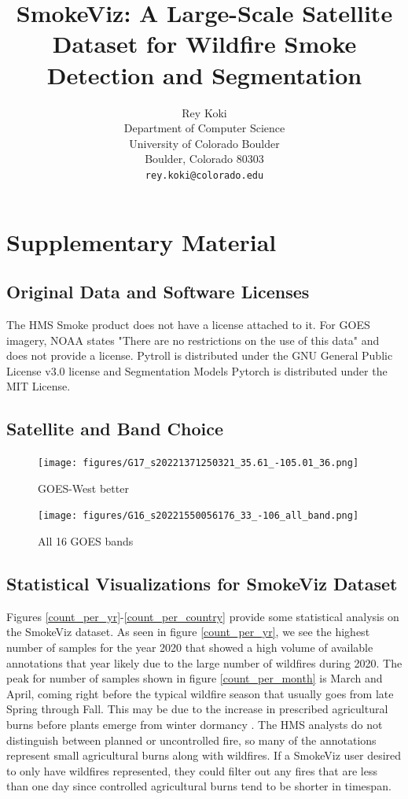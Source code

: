 \documentclass{article}
\title{SmokeViz: A Large-Scale Satellite Dataset for Wildfire Smoke Detection and Segmentation}
\author{%
  Rey Koki\\%
  Department of Computer Science\\
  University of Colorado Boulder\\
  Boulder, Colorado 80303\\
  \texttt{rey.koki@colorado.edu} \\
}
\begin{document}
\appendix

\section{Supplementary Material}

\subsection{Original Data and Software Licenses}

The HMS Smoke product does not have a license attached to it. For GOES imagery, NOAA states "There are no restrictions on the use of this data" and does not provide a license. Pytroll is distributed under the GNU General Public License v3.0 license and Segmentation Models Pytorch is distributed under the MIT License.


\subsection{Satellite and Band Choice}

\begin{figure}[!htb]
    \centering
    \texttt{[image: figures/G17\_s20221371250321\_35.61\_-105.01\_36.png]}
    \caption{GOES-West better}\label{G16_vs_G17}
\end{figure}


\begin{figure}[!htb]
    \centering
    \texttt{[image: figures/G16\_s20221550056176\_33\_-106\_all\_band.png]}
    \caption{All 16 GOES bands}\label{all_bands}
\end{figure}

\subsection{Statistical Visualizations for SmokeViz Dataset}

Figures \ref{count_per_yr}-\ref{count_per_country} provide some statistical analysis on the SmokeViz dataset. As seen in figure \ref{count_per_yr}, we see the highest number of samples for the year 2020 that showed a high volume of available annotations that year likely due to the large number of wildfires \cite{fires2020} during 2020. The peak for number of samples shown in figure \ref{count_per_month} is March and April, coming right before the typical wildfire season that usually goes from late Spring through Fall. This may be due to the increase in prescribed agricultural burns before plants emerge from winter dormancy \cite{ag_fire}. The HMS analysts do not distinguish between planned or uncontrolled fire, so many of the annotations represent small agricultural burns along with wildfires. If a SmokeViz user desired to only have wildfires represented, they could filter out any fires that are less than one day since controlled agricultural burns tend to be shorter in timespan.
\end{document}
